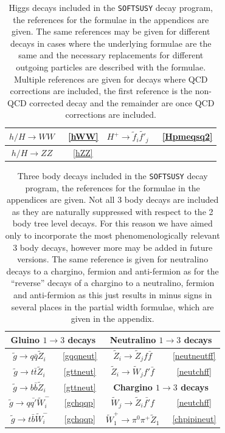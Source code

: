 \documentclass[final,3p,times]{elsarticle}
\begin{document}
\begin{center}
\begin{table}
\begin{tabular}{|c|c|c|c|}
$h/H \rightarrow WW$ &~\ref{hWW} & $H^+ \rightarrow \tilde{f}_i \tilde{f'}_j$ &~\ref{Hpmeqsq2} \\ \hline
$h/H \rightarrow ZZ$ &~\ref{hZZ} & & \\ \hline
\end{tabular}
\caption{Higgs decays included in the {\tt SOFTSUSY} decay program, the references for the formulae in the appendices are given. The same references may be given for different decays in cases where the underlying formulae are the same and the necessary replacements for different outgoing particles are described with the formulae. Multiple references are given for decays where QCD corrections are included, the first reference is the non-QCD corrected decay and the remainder are once QCD corrections are included.}
\label{Higgsdecaysreftable}
\end{table}
\end{center}
\begin{center}
\begin{table}
\centering
\begin{tabular}{|c|c|c|c|} \hline
\multicolumn{2}{|c|}{\bf{Gluino $1 \rightarrow 3$ decays} } & \multicolumn{2}{c|}{\bf{Neutralino $1 \rightarrow 3 $ decays} } \\ \hline
$\tilde{g} \rightarrow q \bar{q} \tilde{Z}_i$ &~\ref{gqqneut} & $\tilde{Z}_i \rightarrow \tilde{Z}_j f \bar{f}$ &~\ref{neutneutff} \\ \hline
$\tilde{g} \rightarrow t \bar{t} \tilde{Z}_i$ &~\ref{gttneut} & $\tilde{Z}_i \rightarrow \tilde{W}_j f' \bar{f}$ &~\ref{neutchff} \\ \hline
$\tilde{g} \rightarrow b \bar{b} \tilde{Z}_i$ &~\ref{gttneut} & \multicolumn{2}{c|}{\bf{Chargino $1 \rightarrow 3 $ decays} } \\ \hline
$\tilde{g} \rightarrow q \bar{q'} \tilde{W}_i^-$ &~\ref{gchqqp} & $\tilde{W}_j \rightarrow \tilde{Z}_i \bar{f'} f$ &~\ref{neutchff} \\ \hline
$\tilde{g} \rightarrow t \bar{b} \tilde{W}_i^-$ &~\ref{gchqqp} &
                                                                 $\tilde{W}_1^+
                                                                 \rightarrow
                                                                 \pi^0 \pi^+ \tilde{Z}_1$&~\ref{chpipineut}\\ \hline
\end{tabular}
\caption{Three body decays included in the {\tt SOFTSUSY} decay program, the
  references for the formulae in the appendices are given. Not all 3 body
  decays are included as they are naturally suppressed with respect to the 2
  body tree level decays. For this reason we have aimed only to incorporate
  the most phenomenologically relevant 3 body decays, however more may be
  added in future versions. The same reference is given for neutralino decays
  to a chargino, fermion and anti-fermion as for the ``reverse'' decays of a
  chargino to a neutralino, fermion and anti-fermion as this just results in
  minus signs in several places in the partial width formulae, which are given
  in the appendix.} 
\label{1to3decaysreftable}
\end{table}
\end{center}
\end{document}
